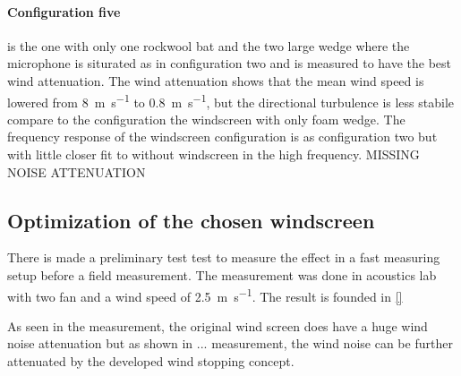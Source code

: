 \paragraph{Configuration five} is the one with only one rockwool bat and the two large wedge where the microphone is siturated as in configuration two and is measured to have the best wind attenuation. The wind attenuation shows that the mean wind speed is lowered from \SI{8}{\meter\per\second} to \SI{0.8}{\meter\per\second}, but the directional turbulence is less stabile compare to the configuration the windscreen with only foam wedge. The frequency response of the windscreen configuration is as configuration two but with little closer fit to without windscreen in the high frequency. MISSING NOISE ATTENUATION 









\subsection{Optimization of the chosen windscreen}





There is made a preliminary test test to measure the effect in a fast measuring setup before a field measurement. The measurement was done in acoustics lab with two fan and a wind speed of \SI{2.5}{\meter\per\second}. The result is founded in \autoref{}




As seen in the measurement, the original wind screen does have a huge wind noise attenuation but as shown in ... measurement, the wind noise can be further attenuated by the developed wind stopping concept. 




